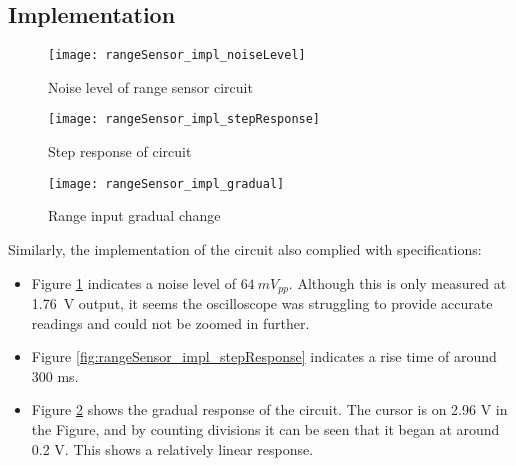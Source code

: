 \subsection{Implementation}

\begin{figure}[!htb]
    \centering
    \texttt{[image: rangeSensor\_impl\_noiseLevel]}
    \caption{Noise level of range sensor circuit}
    \label{fig:rangeSensor_impl_noiseLevel}
\end{figure}

\begin{figure}[!htb]
    \centering
    \begin{minipage}{0.45\textwidth}
        \centering
        \texttt{[image: rangeSensor\_impl\_stepResponse]}
        \caption{Step response of circuit}
        \label{fig:rangeSensor_impl_stepResponse}
    \end{minipage}
    \begin{minipage}{0.45\textwidth}
        \centering
        \texttt{[image: rangeSensor\_impl\_gradual]}
        \caption{Range input gradual change}
        \label{fig:rangeSensor_impl_gradual}
    \end{minipage}
\end{figure}

Similarly, the implementation of the circuit also complied with specifications:
\begin{itemize}
    \item Figure \ref{fig:rangeSensor_impl_noiseLevel} indicates a noise level of $\SI{64}{mV_{pp}}$. Although this is only measured at
          \SI{1.76}{V} output, it seems the oscilloscope was struggling to provide accurate readings and could not be zoomed in further.
    \item Figure \ref{fig:rangeSensor_impl_stepResponse} indicates a rise time of around 300 ms.
    \item Figure \ref{fig:rangeSensor_impl_gradual} shows the gradual response of the circuit. The cursor is on 2.96 V in the Figure, and
          by counting divisions it can be seen that it began at around 0.2 V. This shows a relatively linear response.
\end{itemize}